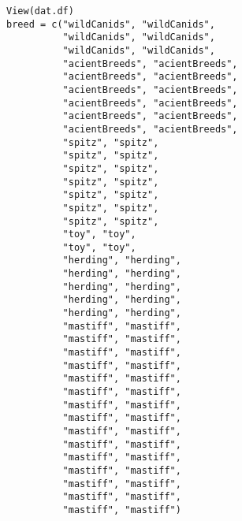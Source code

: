 \documentclass{article} %
\begin{document}
{\begin{verbatim}
View(dat.df)
breed = c("wildCanids", "wildCanids", 
          "wildCanids", "wildCanids",
          "wildCanids", "wildCanids",
          "acientBreeds", "acientBreeds",
          "acientBreeds", "acientBreeds",
          "acientBreeds", "acientBreeds",
          "acientBreeds", "acientBreeds", 
          "acientBreeds", "acientBreeds",
          "acientBreeds", "acientBreeds",
          "spitz", "spitz",
          "spitz", "spitz",
          "spitz", "spitz",
          "spitz", "spitz",
          "spitz", "spitz",
          "spitz", "spitz",
          "spitz", "spitz",
          "toy", "toy", 
          "toy", "toy", 
          "herding", "herding",
          "herding", "herding",
          "herding", "herding",
          "herding", "herding",
          "herding", "herding",
          "mastiff", "mastiff",
          "mastiff", "mastiff",
          "mastiff", "mastiff",
          "mastiff", "mastiff",
          "mastiff", "mastiff",
          "mastiff", "mastiff",
          "mastiff", "mastiff",
          "mastiff", "mastiff",
          "mastiff", "mastiff",
          "mastiff", "mastiff",
          "mastiff", "mastiff",
          "mastiff", "mastiff",
          "mastiff", "mastiff",
          "mastiff", "mastiff",
          "mastiff", "mastiff")


\end{verbatim}}
\end{document}
